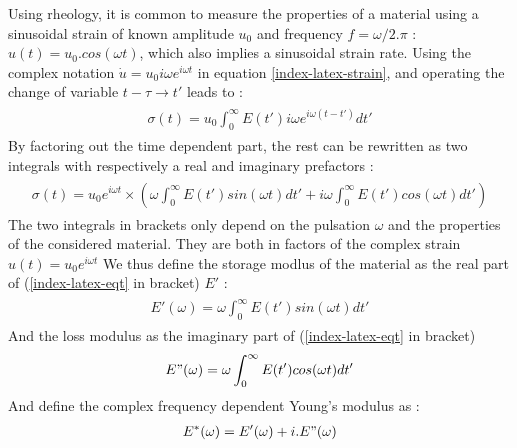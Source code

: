 \documentclass[A4paperpaper,11pt,english]{sphinxmanual}
\begin{document}
Using rheology, it is common to measure the properties of a material using a
sinusoidal strain of known amplitude \(u_0\) and frequency \(f =
\omega/ 2.\pi\) : \(u(t) = u_0.cos(\omega t)\), which also implies a
sinusoidal strain rate. Using the complex notation \(\dot u = u_0 i\omega
e^{i\omega t}\) in equation \eqref{index-latex-strain}, and operating the change of variable \(t-\tau \to t'\)  leads to :
\label{index-latex:equation-eqa13}\begin{gather}
\begin{split}\sigma(t) = u_0\int_0^\infty E(t') i\omega e^{i\omega(t-t')}dt'\end{split}\label{index-latex-eqa13}
\end{gather}
By factoring out the time dependent part, the rest can be rewritten as two integrals with respectively a real and imaginary prefactors :
\label{index-latex:equation-eqt}\begin{gather}
\begin{split}\sigma(t) = u_0e^{i\omega t}\times\left(
          \omega \int_0^\infty E(t')  sin(\omega t) dt'
          +
        i \omega \int_0^\infty E(t') cos(\omega t) dt'
\right)\end{split}\label{index-latex-eqt}
\end{gather}
The two integrals in brackets only depend on the pulsation \(\omega\) and the properties of the considered material.
They are both in factors of the complex strain \(u(t) = u_0 e^{i\omega t}\)
We thus define the storage modlus of the material as the real part of (\eqref{index-latex-eqt} in bracket) \(E'\) :
\label{index-latex:equation-eqa14}\begin{gather}
\begin{split}E'(\omega) =  \omega \int_0^\infty E(t')  sin(\omega t) dt'\end{split}\label{index-latex-eqa14}
\end{gather}
And the loss modulus as the imaginary part of (\eqref{index-latex-eqt} in bracket)
\label{index-latex:equation-eqa15}\begin{gather}
\begin{split}E"(\omega) =  \omega \int_0^\infty E(t')  cos(\omega t) dt'\end{split}\label{index-latex-eqa15}
\end{gather}
And define the complex frequency dependent Young's modulus as :
\label{index-latex:equation-eqa16}\begin{gather}
\begin{split}E^*(\omega) = E'(\omega) + i.E"(\omega)\end{split}\label{index-latex-eqa16}
\end{gather}
\end{document}
